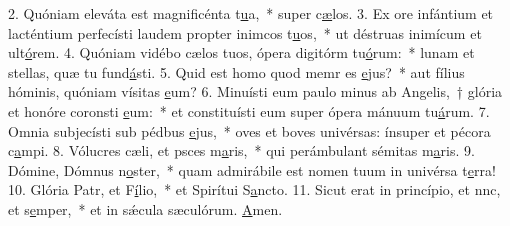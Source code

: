 2. Quóniam eleváta est magnificénta t\uline{u}a,~* super c\uline{æ}los.
3. Ex ore infántium et lacténtium perfecísti laudem propter inimcos t\uline{u}os,~* ut déstruas inimícum et ult\uline{ó}rem.
4. Quóniam vidébo cælos tuos, ópera digitórm tu\uline{ó}rum:~* lunam et stellas, quæ tu fund\uline{á}sti.
5. Quid est homo quod memr es \uline{e}jus?~* aut fílius hóminis, quóniam vísitas \uline{e}um?
6. Minuísti eum paulo minus ab Angelis,~† glória et honóre coronsti \uline{e}um:~* et constituísti eum super ópera mánuum tu\uline{á}rum.
7. Omnia subjecísti sub pédbus \uline{e}jus,~* oves et boves univérsas: ínsuper et pécora c\uline{a}mpi.
8. Vólucres cæli, et psces m\uline{a}ris,~* qui perámbulant sémitas m\uline{a}ris.
9. Dómine, Dómnus n\uline{o}ster,~* quam admirábile est nomen tuum in univérsa t\uline{e}rra!
10. Glória Patr, et F\uline{í}lio,~* et Spirítui S\uline{a}ncto.
11. Sicut erat in princípio, et nnc, et s\uline{e}mper,~* et in sǽcula sæculórum. \uline{A}men.

